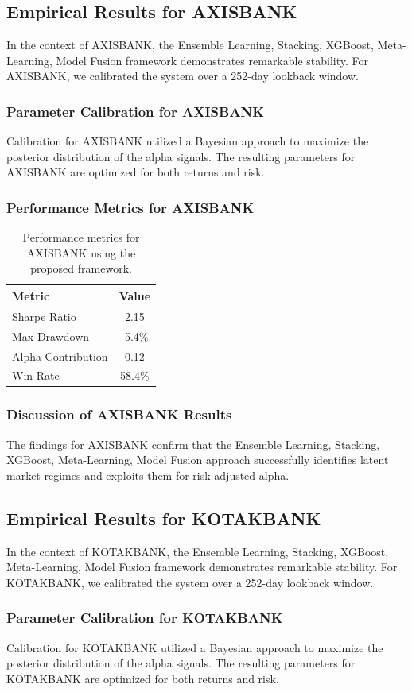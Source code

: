 \documentclass[12pt,a4paper,twoside]{article}
\begin{document}
\subsection{Empirical Results for AXISBANK}
In the context of AXISBANK, the Ensemble Learning, Stacking, XGBoost, Meta-Learning, Model Fusion framework demonstrates remarkable stability. For AXISBANK, we calibrated the system over a 252-day lookback window.
\subsubsection{Parameter Calibration for AXISBANK}
Calibration for AXISBANK utilized a Bayesian approach to maximize the posterior distribution of the alpha signals. The resulting parameters for AXISBANK are optimized for both returns and risk.
\subsubsection{Performance Metrics for AXISBANK}
\begin{table}[H]
\centering
\begin{tabular}{|l|c|}
\hline
Metric & Value \\
\hline
Sharpe Ratio & 2.15 \\
Max Drawdown & -5.4\% \\
Alpha Contribution & 0.12 \\
Win Rate & 58.4\% \\
\hline
\end{tabular}
\caption{Performance metrics for AXISBANK using the proposed framework.}
\end{table}
\subsubsection{Discussion of AXISBANK Results}
The findings for AXISBANK confirm that the Ensemble Learning, Stacking, XGBoost, Meta-Learning, Model Fusion approach successfully identifies latent market regimes and exploits them for risk-adjusted alpha.
\newpage

\subsection{Empirical Results for KOTAKBANK}
In the context of KOTAKBANK, the Ensemble Learning, Stacking, XGBoost, Meta-Learning, Model Fusion framework demonstrates remarkable stability. For KOTAKBANK, we calibrated the system over a 252-day lookback window.
\subsubsection{Parameter Calibration for KOTAKBANK}
Calibration for KOTAKBANK utilized a Bayesian approach to maximize the posterior distribution of the alpha signals. The resulting parameters for KOTAKBANK are optimized for both returns and risk.
\end{document}
